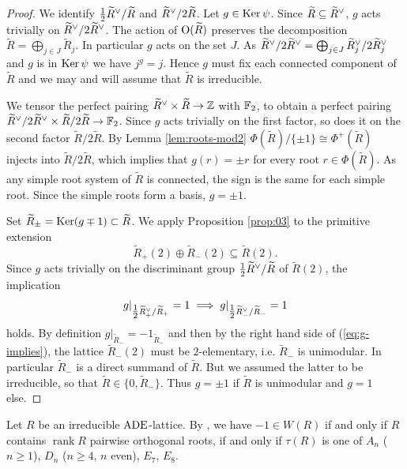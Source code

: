 \documentclass{amsart}
\numberwithin{procedure}{section}
\DeclareMathOperator{\rk}{rank}
\newcommand{\rl}{R}
\newcommand{\trl}{\widetilde{\rl}}
\renewcommand{\ker}{\Ker}
\begin{document}
\begin{proof}
 We identify $\tfrac{1}{2}\trl\dual /\trl$ and $\trl\dual /2\trl$. Let $g \in \ker \psi$.
 Since $\trl \subseteq \trl\dual $, $g$ acts trivially
 on $\trl\dual /2\trl\dual $. The action of $\OG(\trl)$ preserves the decomposition $\trl = \bigoplus_{j \in J} \trl_j$.
 In particular $g$ acts on the set $J$. As $\trl\dual /2\trl\dual = \bigoplus_{j \in J}\trl_j\dual /2\trl_j\dual $ and $g$ is in $\ker \psi$ we have $j^g=j$. Hence $g$ must fix each connected component of $\trl$ and we may and will assume that $\trl$ is irreducible.
\par
 We tensor the perfect pairing $\trl\dual  \times \trl \rightarrow \Z$ with $\mathord{\mathbb F}_2$,
 to obtain a perfect pairing $\trl\dual /2\trl\dual   \times \trl/2\trl \rightarrow \F_2$. Since $g$ acts trivially on the first factor, so does it on the second factor $\trl/2\trl$.
 By Lemma \ref{lem:roots-mod2} $\Phi(\trl)/\{\pm 1\} \cong \Phi^+(\trl)$ injects into $\trl/2\trl$, which implies that
 $g(r)= \pm r$ for every root $r\in \Phi(\trl)$.
 As any simple root system of $\trl$ is connected, the sign is the same for each simple root.
 Since the simple roots form a basis, $g=\pm 1$.
\par
 Set $\trl_\pm= \ker(g\mp 1)\subset \trl$.
 We apply Proposition \ref{prop:03} to the primitive extension
 \[\trl_+(2) \oplus \trl_-(2)
 \subseteq \trl(2).\]
 Since $g$ acts trivially on the discriminant
 group $\tfrac{1}{2}\trl\dual /\trl$ of $\trl(2)$,
 the implication
 \begin{equation}\label{eq:g-implies}
g|_{\tfrac{1}{2}\trl_{+}\dual /\trl_+}=1 \implies
 g|_{\tfrac{1}{2}\trl_{-}\dual /\trl_-}=1
 \end{equation}
 holds.
 By definition $g|_{\trl_-}=-1_{\trl_-}$ and then by the right hand side of (\ref{eq:g-implies}), 
 the lattice $\trl_{-}(2)$ must be $2$-elementary, i.e. $\trl_-$ is unimodular.
 In particular $\trl_-$ is a direct summand of $\trl$.
 But we assumed the latter to be irreducible, so that
 $\trl\in\{0,\trl_-\}$. Thus $g=\pm 1$ if $\trl$ is unimodular and $g = 1$ else.
\end{proof}
%
\begin{remark}\label{rem:-1}
Let $\rl$ be an irreducible $\mathord{\rm ADE}$-lattice.
By \cite[Proposition 1.5]{ebeling:lattices-and-codes}, we have $-1 \in W(\rl)$ if and only if
$\rl$ contains $\rk \rl$ pairwise orthogonal roots,
if and only if $\tau(\rl)$ is one of $A_n$ ($n\geq 1$), $D_n$ ($n\geq 4$, $n$ even), $E_7$, $E_8$.
\end{remark}
%
%
\end{document}
